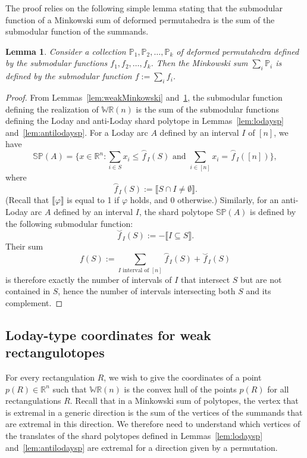 \documentclass{amsart}
\newtheorem{lemma}[theorem]{Lemma}
\theoremstyle{definition}
\newcommand{\R}{\mathbb{R}} %
\newcommand{\polytope}[1]{\mathds{#1}} %
\newcommand{\WRP}{\polytope{WR}} %
\newcommand{\SP}{\polytope{SP}}
\newcommand{\loday}[1]{\overset{\frown}{#1}}
\newcommand{\antiloday}[1]{\overset{\smile}{#1}}
\begin{document}
The proof relies on the following simple lemma stating that the submodular function of a Minkowski sum of deformed permutahedra is the sum of the submodular function of the summands.

\begin{lemma}
  \label{lem:submodsum}
  Consider a collection $\polytope{P}_1, \polytope{P}_2,\ldots ,\polytope{P}_k$ of deformed permutahedra defined by the submodular functions $f_1,f_2,\ldots ,f_k$. Then the Minkowski sum $\sum_i \polytope{P}_i$ is defined by the submodular function $f:=\sum_i f_i$.
\end{lemma}

\begin{proof}
  From Lemmas~\ref{lem:weakMinkowski} and~\ref{lem:submodsum}, the submodular function defining the realization of $\WRP(n)$ is the sum of the submodular functions defining the Loday and anti-Loday shard polytope in Lemmas~\ref{lem:lodaysp} and~\ref{lem:antilodaysp}. For a Loday arc $A$ defined by an interval $I$ of $[n]$, we have
  \[
  \SP(A) = \{ x\in\R^n : \sum_{i\in S} x_i \leq \loday{f}_I(S) \text { and } \sum_{i\in [n]} x_i = \loday{f}_I([n]) \},
  \]
  where
  \[
  \loday{f}_I(S) := \llbracket S\cap I\not=\emptyset \rrbracket .
  \]
  (Recall that $\llbracket \varphi\rrbracket$ is equal to 1 if $\varphi$ holds, and 0 otherwise.)
  Similarly, for an anti-Loday arc $A$ defined by an interval $I$, the shard polytope $\SP(A)$ is defined by the following submodular function:
  \[
  \antiloday{f}_I(S) := - \llbracket I\subseteq S \rrbracket .
  \]
  Their sum
  \[
  f(S) := \sum_{I\text{ interval of }[n]} \loday{f}_I(S) + \antiloday{f}_I(S)
  \]
  is therefore exactly the number of intervals of $I$ that intersect $S$ but are not contained in $S$, hence the number of intervals intersecting both $S$ and its complement.
\end{proof}

\subsection{Loday-type coordinates for weak rectangulotopes}

For every rectangulation $R$, we wish to give the coordinates of a point $p(R)\in\R^n$ such that $\WRP(n)$ is the convex hull of the points $p(R)$ for all rectangulations $R$.
Recall that in a Minkowski sum of polytopes, the vertex that is extremal in a generic direction is the sum of the vertices of the summands that are extremal in this direction.
We therefore need to understand which vertices of the translates of the shard polytopes defined in Lemmas~\ref{lem:lodaysp} and~\ref{lem:antilodaysp} are extremal for a direction given by a permutation.
\end{document}
